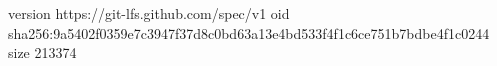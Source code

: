 version https://git-lfs.github.com/spec/v1
oid sha256:9a5402f0359e7c3947f37d8c0bd63a13e4bd533f4f1c6ce751b7bdbe4f1c0244
size 213374

